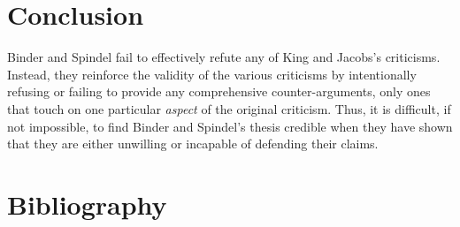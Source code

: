\documentclass[
  11pt,
]{article}
\begin{document}
\hypertarget{conclusion}{%
\section{Conclusion}\label{conclusion}}

Binder and Spindel fail to effectively refute any of King and Jacobs's
criticisms. Instead, they reinforce the validity of the various
criticisms by intentionally refusing or failing to provide any
comprehensive counter-arguments, only ones that touch on one particular
\emph{aspect} of the original criticism. Thus, it is difficult, if not
impossible, to find Binder and Spindel's thesis credible when they have
shown that they are either unwilling or incapable of defending their
claims.

\clearpage
\newpage
\onehalfspace
{}

\thispagestyle{BIB}

\hypertarget{bibliography}{%
\section*{Bibliography}\label{bibliography}}
\end{document}
